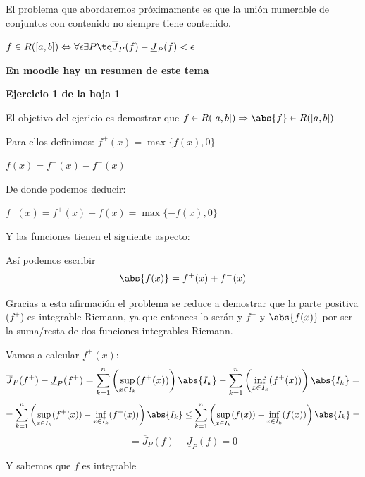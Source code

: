 \documentclass{apuntes}
\begin{document}
El problema que abordaremos próximamente es que la unión numerable de conjuntos con contenido no siempre tiene contenido.

\obs $f\in R([a,b]) \Leftrightarrow \forall \epsilon \exists P \tq \overline{J}_P(f)-\underline{J}_P(f) < \epsilon$


\textbf{En moodle hay un resumen de este tema}

\begin{example}
\textbf{Ejercicio 1 de la hoja 1}

El objetivo del ejericio es demostrar que $f\in R([a,b]) \Rightarrow \abs{f}\in R([a,b])$

Para ellos definimos:
$f^+(x) = \max\lbrace f(x), 0 \rbrace$

$f(x) = f^+(x) - f^-(x)$

De donde podemos deducir:

$f^-(x) = f^+(x)-f(x)=\max \lbrace -f(x), 0 \rbrace$

Y las funciones tienen el siguiente aspecto:

\begin{center}
\end{center}


Así podemos escribir \[ \abs{f(x)} = f^+(x)+f^-(x) \]

Gracias a esta afirmación el problema se reduce a demostrar que la parte positiva ($f^+$) es integrable Riemann, ya que entonces lo serán  y $f^-$  y $\abs{f(x)}$  por ser la suma/resta de dos funciones integrables Riemann.


Vamos a calcular $f^+(x)$:
\[\overline{J}_P(f^+)-\underline{J}_P(f^+) = \sum_{k=1}^n\left(\sup_{x\in I_k}(f^+(x))\right)\abs{I_k} - \sum_{k=1}^n\left(\inf_{x\in I_k}(f^+(x))\right)\abs{I_k}=\]
\[= \sum_{k=1}^n\left(\sup_{x\in I_k}(f^+(x))-\inf_{x\in I_k}(f^+(x))\right)\abs{I_k} \leq
\sum_{k=1}^n\left(\sup_{x\in I_k}(f(x))-\inf_{x\in I_k}(f(x))\right)\abs{I_k} =\] \[=\overline{J}_P(f)-\underline{J}_P(f) = 0\]

Y sabemos que $f$ es integrable
\end{example}
\end{document}
